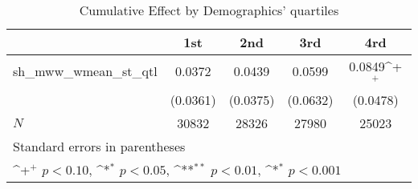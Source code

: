 \begin{table}[htbp]\centering
\def\sym#1{\ifmmode^{#1}\else\(^{#1}\)\fi}
\caption{Cumulative Effect by Demographics' quartiles}
\begin{tabular}{l*{4}{c}}
\hline\hline
            &\multicolumn{1}{c}{1st}&\multicolumn{1}{c}{2nd}&\multicolumn{1}{c}{3rd}&\multicolumn{1}{c}{4rd}\\
\hline
sh\_mww\_wmean\_st\_qtl&      0.0372       &      0.0439       &      0.0599       &      0.0849\sym{+}\\
            &    (0.0361)       &    (0.0375)       &    (0.0632)       &    (0.0478)       \\
\hline
\(N\)       &       30832       &       28326       &       27980       &       25023       \\
\hline\hline
\multicolumn{5}{l}{\footnotesize Standard errors in parentheses}\\
\multicolumn{5}{l}{\footnotesize \sym{+} \(p<0.10\), \sym{*} \(p<0.05\), \sym{**} \(p<0.01\), \sym{*} \(p<0.001\)}\\
\end{tabular}
\end{table}
